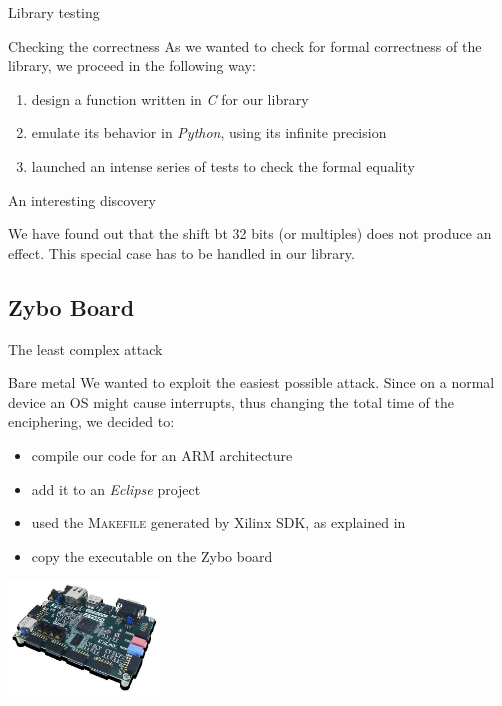 \documentclass[aspectratio=169, handout]{beamer}
\begin{document}
\begin{frame}{Library testing}
  \begin{block}{Checking the correctness}
    As we wanted to check for formal correctness of the library, we proceed in the following way:
    \begin{enumerate}
      \pause \item design a function written in \textit{C} for our library
      \pause \item emulate its behavior in \textit{Python}, using its infinite precision
      \pause \item launched an intense series of tests to check the formal equality
    \end{enumerate}
  \end{block}

  \pause
  \begin{alert}{An interesting discovery}

    We have found out that the shift bt 32 bits (or multiples) does not produce an effect. This special case has to be handled in our library.
  \end{alert}
\end{frame}

\subsection{Zybo Board}
\begin{frame}{The least complex attack}
	\begin{block}{Bare metal}
		We wanted to exploit the easiest possible attack. Since on a normal device an OS might cause interrupts, thus changing the total time of the enciphering, we decided to:
		\begin{itemize}
			\pause \item compile our code for an ARM architecture
			\pause \item add it to an \textit{Eclipse} project
			\pause \item used the \textsc{Makefile} generated by Xilinx SDK, as explained in \cite{xilinx2015zynq}
			\pause \item copy the executable on the Zybo board
		\end{itemize}
    \begin{center}
      \includegraphics[width=4cm]{./graphics/zybo}
    \end{center}
	\end{block}
\end{frame}
\end{document}
